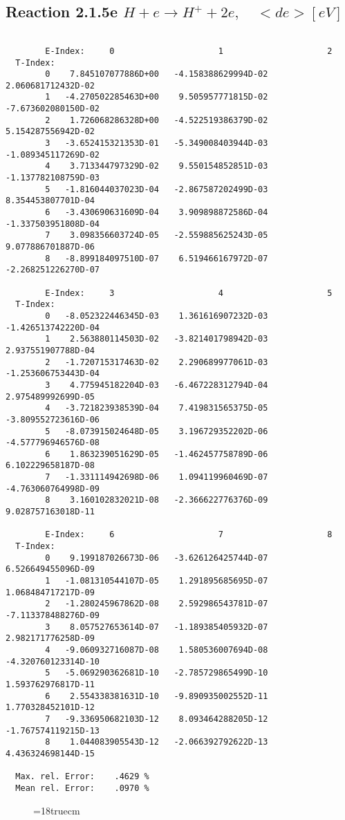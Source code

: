 \newpage

\subsection{
Reaction 2.1.5e   $ H + e \rightarrow H^+ + 2e, \quad  <de>  [eV]$}


\begin{verbatim}

        E-Index:     0                     1                     2
  T-Index:
        0    7.845107077886D+00   -4.158388629994D-02    2.060681712432D-02
        1   -4.270502285463D+00    9.505957771815D-02   -7.673602080150D-02
        2    1.726068286328D+00   -4.522519386379D-02    5.154287556942D-02
        3   -3.652415321353D-01   -5.349008403944D-03   -1.089345117269D-02
        4    3.713344797329D-02    9.550154852851D-03   -1.137782108759D-03
        5   -1.816044037023D-04   -2.867587202499D-03    8.354453807701D-04
        6   -3.430690631609D-04    3.909898872586D-04   -1.337503951808D-04
        7    3.098356603724D-05   -2.559885625243D-05    9.077886701887D-06
        8   -8.899184097510D-07    6.519466167972D-07   -2.268251226270D-07

        E-Index:     3                     4                     5
  T-Index:
        0   -8.052322446345D-03    1.361616907232D-03   -1.426513742220D-04
        1    2.563880114503D-02   -3.821401798942D-03    2.937551907788D-04
        2   -1.720715317463D-02    2.290689977061D-03   -1.253606753443D-04
        3    4.775945182204D-03   -6.467228312794D-04    2.975489992699D-05
        4   -3.721823938539D-04    7.419831565375D-05   -3.809552723616D-06
        5   -8.073915024648D-05    3.196729352202D-06   -4.577796946576D-08
        6    1.863239051629D-05   -1.462457758789D-06    6.102229658187D-08
        7   -1.331114942698D-06    1.094119960469D-07   -4.763060764998D-09
        8    3.160102832021D-08   -2.366622776376D-09    9.028757163018D-11

        E-Index:     6                     7                     8
  T-Index:
        0    9.199187026673D-06   -3.626126425744D-07    6.526649455096D-09
        1   -1.081310544107D-05    1.291895685695D-07    1.068484717217D-09
        2   -1.280245967862D-08    2.592986543781D-07   -7.113378488276D-09
        3    8.057527653614D-07   -1.189385405932D-07    2.982171776258D-09
        4   -9.060932716087D-08    1.580536007694D-08   -4.320760123314D-10
        5   -5.069290362681D-10   -2.785729865499D-10    1.593762976817D-11
        6    2.554338381631D-10   -9.890935002552D-11    1.770328452101D-12
        7   -9.336950682103D-12    8.093464288205D-12   -1.767574119215D-13
        8    1.044083905543D-12   -2.066392792622D-13    4.436324698144D-15

  Max. rel. Error:    .4629 %
  Mean rel. Error:    .0970 %

\end{verbatim}
\begin{figure} \label{2.1.5li2}
\epsfxsize=18truecm
\end{figure}
\newpage

